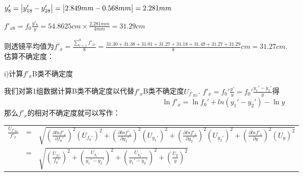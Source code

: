 \documentclass[UTF8]{ctexart}
\begin{document}
\quad{}$y'_8=\big{|}y'_{18}-y'_{28}\big{|}=\big{|}2.849mm-0.568mm\big{|}=2.281mm$\par\quad\quad\quad\quad\quad{}$\displaystyle{f'_{x8}=f_0\frac{y'_8}{y}=54.8625cm\times \frac{2.281mm}{4mm}=31.29cm}$\par\vspace{1em}
则透镜平均值为$\displaystyle{\overline{f'_x}=\frac{\sum_{i=1}^{8}f'_{xi}}{8}=\frac{31.30+31.38+31.01+31.27+31.18+31.49+31.27+31.29}{8}cm=31.27cm}$.\\
估算不确定度：\par
i)计算$f'_x$B类不确定度\par 
我们对第1组数据计算B类不确定度以代替$f'_x$B类不确定度$U_{f'_{Bx}}$. $\displaystyle{f'_x=f_0'\frac{y'}{y}=f_0'\frac{y_1'-y_2'}{y}}$得
\[\ln f'_x=\ln f_0'+ln(y_1'-y_2')-\ln y\]
那么$f'_x$的相对不确定度就可以写作：
\begin{table}[H]
\begin{center}

    \begin{tabular}{r c l}
$\displaystyle{\frac{U_{f'_{Bx}}}{f'_x}}$&=&
$\displaystyle{\sqrt{(\frac{\partial ln f'_x}{\partial f_0'})^2(U_{f_0'})^2+(\frac{\partial ln f'_x}{\partial y_1'})^2(U_{y_1'})^2+(\frac{\partial ln f'_x}{\partial y_2'})^2(U_{y_2'})^2+(\frac{\partial ln f'_x}{\partial y})^2(U_{y})^2}}$\\

\quad&=&$\displaystyle{\sqrt{(\frac{U_{f_0'}}{f_0'})^2+(\frac{U_{y_1'}}{y_1'-y_2'})^2+(\frac{U_{y_2'}}{y_1'-y_2'})^2+(\frac{U_{y}}{y})^2}}$

    \end{tabular}
\end{center}
\end{table}

\end{document}
